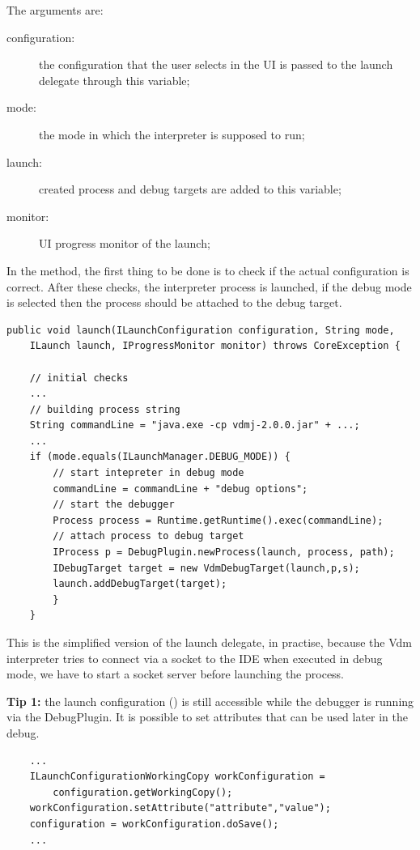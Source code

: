 The arguments are:
\begin{description}
\item[configuration:]  the configuration that the user selects in the UI is passed to the launch delegate through this variable;

\item[mode:] the mode in which the interpreter is supposed to run;

\item[launch:] created process and debug targets are added to this variable;

\item[monitor:] UI progress monitor of the launch;
\end{description}

In the  method, the first thing to be done is to check if the actual configuration is correct. After these checks, the interpreter process is launched, if the debug mode is selected then the process should be attached to the debug target.

\begin{lstlisting}
public void launch(ILaunchConfiguration configuration, String mode,
	ILaunch launch, IProgressMonitor monitor) throws CoreException {
	
	// initial checks
	...
	// building process string
	String commandLine = "java.exe -cp vdmj-2.0.0.jar" + ...;
	...
	if (mode.equals(ILaunchManager.DEBUG_MODE)) {
		// start intepreter in debug mode
		commandLine = commandLine + "debug options";
		// start the debugger
		Process process = Runtime.getRuntime().exec(commandLine);
		// attach process to debug target
		IProcess p = DebugPlugin.newProcess(launch, process, path);
		IDebugTarget target = new VdmDebugTarget(launch,p,s);
		launch.addDebugTarget(target);
		}
	}
\end{lstlisting}
This is the simplified version of the launch delegate, in practise, because the Vdm interpreter tries to connect via a socket to the IDE when executed in debug mode, we have to start a socket server before launching the process.


\textbf{Tip 1:} the launch configuration () is still accessible while the debugger is running via the DebugPlugin. It is possible to set attributes that can be used later in the debug.
\begin{lstlisting}
	...
	ILaunchConfigurationWorkingCopy workConfiguration = 
		configuration.getWorkingCopy();		
	workConfiguration.setAttribute("attribute","value");
	configuration = workConfiguration.doSave();
	...
\end{lstlisting}

